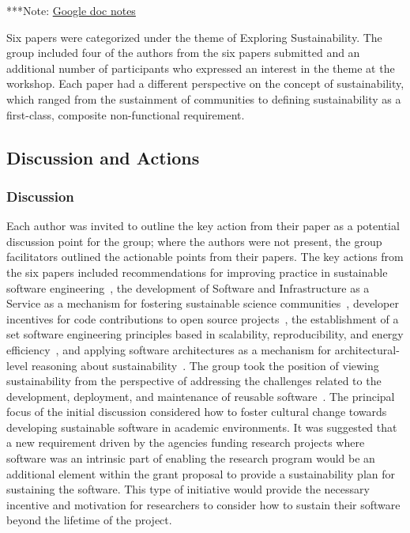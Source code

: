 \documentclass[11pt, oneside]{amsart}
\newcommand{\note}[1]{ {\textcolor{blueish}    { ***Note:      #1 }}}
\begin{document}
\note{\href{http://tinyurl.com/mpbhvyb}{Google doc notes}}

Six papers were categorized under the theme of Exploring Sustainability. The group included four of the authors
from the six papers submitted and an additional number of participants who expressed an interest in the theme at the
workshop. Each paper had a different perspective on the concept of sustainability, which ranged from the sustainment of
communities to defining sustainability as a first-class, composite non-functional requirement.
\subsection{Discussion and Actions}
\subsubsection{Discussion}

Each author was invited to outline the key action from their paper as a potential discussion point for the group; where the authors were not present,
the group facilitators outlined the actionable points from their papers.
The key actions from the six papers included recommendations for improving practice in sustainable software
engineering~\cite{wssspe2_rosada_de_souza, wssspe2_downs}, the development of Software and Infrastructure as a Service
as a mechanism for fostering sustainable science communities~\cite{wssspe2_patra}, developer incentives for code contributions to open source projects~\cite{wssspe2_pierce}, the establishment of a set software engineering principles based in
scalability, reproducibility, and energy efficiency~\cite{wssspe2_shi}, and applying software architectures as a mechanism
for architectural-level reasoning about sustainability~\cite{wssspe2_venters}. The group took the position of viewing
sustainability from the perspective of addressing the challenges related to the development, deployment, and maintenance of
reusable software~\cite{katzJORS2014}. The principal focus of the initial discussion considered how to foster cultural change towards developing sustainable software in academic environments. It was suggested that a new requirement driven by the agencies funding research projects where software was an intrinsic part of enabling the research program would be an additional element within the grant proposal to provide a sustainability plan for sustaining the software. This type of initiative would provide the necessary incentive and motivation for researchers to consider how to sustain their software beyond the lifetime of the project.
\end{document}
